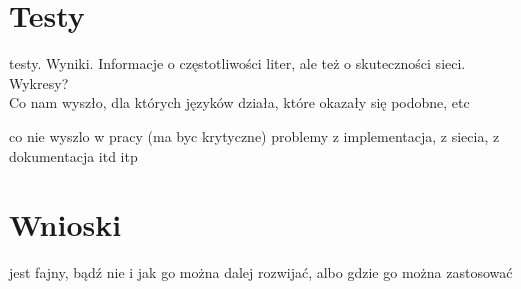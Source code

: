 \documentclass[journal]{IEEEtran}
\begin{document}
\section{Testy}
 testy. Wyniki. Informacje o częstotliwości liter, ale też o skuteczności sieci. Wykresy? \\
Co nam wyszło, dla których języków działa, które okazały się podobne, etc

co nie wyszlo w pracy (ma byc krytyczne) problemy z implementacja, z siecia, z dokumentacja itd itp

\section{Wnioski}
 jest fajny, bądź nie i jak go można dalej rozwijać, albo gdzie go można zastosować






%


\ifCLASSOPTIONcaptionsoff
  \newpage
\fi


\end{document}
